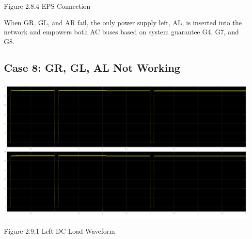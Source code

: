 \documentclass{mcmthesis}
\begin{document}
\begin{center}
\small{Figure 2.8.4 EPS Connection}
\end{center}
When GR, GL,  and AR fail,  the only power supply left, AL, is inserted into the network and empowers both AC buses based on system guarantee G4, G7, and G8.
\pagebreak

\subsection{Case 8: GR, GL, AL Not Working}
\begin{center}
\includegraphics[trim= 0 0.28\imageheight{} 0 0, clip, width = 0.165\imageheight{}]{gl_gr_al_load1.png}
\end{center}
\begin{center}
\small{Figure 2.9.1 Left DC Load Waveform}
\end{center}
\end{document}
